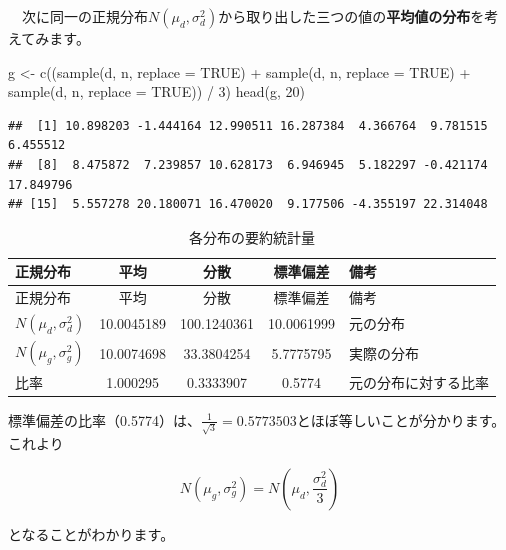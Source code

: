 \documentclass[a4paper]{tufte-handout}
\newenvironment{Shaded}{}{}
\newcommand{\AttributeTok}[1]{\textcolor[rgb]{0.49,0.56,0.16}{#1}}
\newcommand{\ConstantTok}[1]{\textcolor[rgb]{0.53,0.00,0.00}{#1}}
\newcommand{\DecValTok}[1]{\textcolor[rgb]{0.25,0.63,0.44}{#1}}
\newcommand{\FunctionTok}[1]{\textcolor[rgb]{0.02,0.16,0.49}{#1}}
\newcommand{\NormalTok}[1]{#1}
\newcommand{\OtherTok}[1]{\textcolor[rgb]{0.00,0.44,0.13}{#1}}
\newcommand{\SpecialCharTok}[1]{\textcolor[rgb]{0.25,0.44,0.63}{#1}}
\begin{document}
　次に同一の正規分布\(N(\mu_d, \sigma^2_d)\)から取り出した三つの値の\textbf{平均値の分布}を考えてみます。
　

\begin{Shaded}
\begin{Highlighting}[numbers=left,,]
\NormalTok{g }\OtherTok{\textless{}{-}} \FunctionTok{c}\NormalTok{((}\FunctionTok{sample}\NormalTok{(d, n, }\AttributeTok{replace =} \ConstantTok{TRUE}\NormalTok{) }\SpecialCharTok{+} \FunctionTok{sample}\NormalTok{(d, n, }\AttributeTok{replace =} \ConstantTok{TRUE}\NormalTok{) }
        \SpecialCharTok{+} \FunctionTok{sample}\NormalTok{(d, n, }\AttributeTok{replace =} \ConstantTok{TRUE}\NormalTok{)) }\SpecialCharTok{/} \DecValTok{3}\NormalTok{)}
\FunctionTok{head}\NormalTok{(g, }\DecValTok{20}\NormalTok{)}
\end{Highlighting}
\end{Shaded}

\begin{verbatim}
##  [1] 10.898203 -1.444164 12.990511 16.287384  4.366764  9.781515  6.455512
##  [8]  8.475872  7.239857 10.628173  6.946945  5.182297 -0.421174 17.849796
## [15]  5.557278 20.180071 16.470020  9.177506 -4.355197 22.314048
\end{verbatim}

\begin{longtable}[]{@{}lcccl@{}}
\caption{各分布の要約統計量}\tabularnewline
\toprule
正規分布 & 平均 & 分散 & 標準偏差 & 備考 \\
\midrule
\endfirsthead
\toprule
正規分布 & 平均 & 分散 & 標準偏差 & 備考 \\
\midrule
\endhead
\(N(\mu_d, \sigma^2_d)\) & 10.0045189 & 100.1240361 & 10.0061999 &
元の分布 \\
\(N(\mu_g, \sigma^2_g)\) & 10.0074698 & 33.3804254 & 5.7775795 &
実際の分布 \\
比率 & 1.000295 & 0.3333907 & 0.5774 & 元の分布に対する比率 \\
\bottomrule
\end{longtable}

標準偏差の比率（0.5774）は、\(\frac{1}{\sqrt{3}} = 0.5773503\)とほぼ等しいことが分かります。これより

\[N(\mu_g, \sigma^2_g) = N(\mu_d, \frac{\sigma^2_d}{3})\]

となることがわかります。
\end{document}
